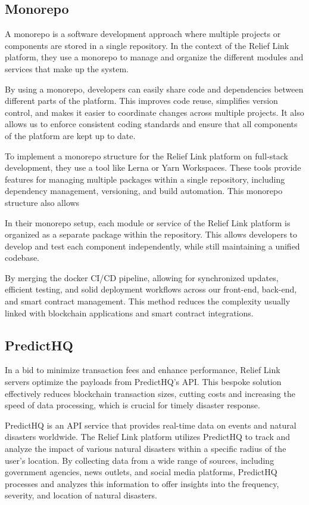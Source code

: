 \documentclass[conference]{IEEEtran}
\begin{document}
\subsection{Monorepo}
A monorepo is a software development approach where multiple projects or components are stored in a single repository. In the context of the Relief Link platform, they use a monorepo to manage and organize the different modules and services that make up the system.

By using a monorepo, developers can easily share code and dependencies between different parts of the platform. This improves code reuse, simplifies version control, and makes it easier to coordinate changes across multiple projects. It also allows us to enforce consistent coding standards and ensure that all components of the platform are kept up to date.

To implement a monorepo structure for the Relief Link platform on full-stack development, they use a tool like Lerna or Yarn Workspaces. These tools provide features for managing multiple packages within a single repository, including dependency management, versioning, and build automation. This monorepo structure also allows

In their monorepo setup, each module or service of the Relief Link platform is organized as a separate package within the repository. This allows developers to develop and test each component independently, while still maintaining a unified codebase.

By merging the docker CI/CD pipeline, allowing for synchronized updates, efficient testing, and solid deployment workflows across our front-end, back-end, and smart contract management. This method reduces the complexity usually linked with blockchain applications and smart contract integrations.

\subsection{PredictHQ}
In a bid to minimize transaction fees and enhance performance, Relief Link servers optimize the payloads from PredictHQ’s API. This bespoke solution effectively reduces blockchain transaction sizes, cutting costs and increasing the speed of data processing, which is crucial for timely disaster response.

PredictHQ is an API service that provides real-time data on events and natural disasters worldwide. The Relief Link platform utilizes PredictHQ to track and analyze the impact of various natural disasters within a specific radius of the user's location. By collecting data from a wide range of sources, including government agencies, news outlets, and social media platforms, PredictHQ processes and analyzes this information to offer insights into the frequency, severity, and location of natural disasters.
\end{document}
